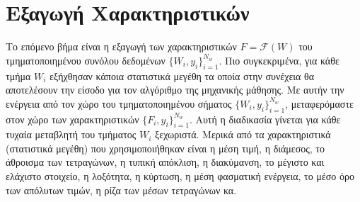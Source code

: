 \documentclass[12pt, a4paper]{article}
\begin{document}
\section{Εξαγωγή Χαρακτηριστικών}
Το επόμενο βήμα είναι η εξαγωγή των χαρακτηριστικών $F = \mathcal{F}(W)$ του τμηματοποιημένου συνόλου δεδομένων $\{W_{i}, y_{i}\}_{i=1}^{N_{w}}$. Πιο συγκεκριμένα, για κάθε τμήμα $W_{i}$ εξήχθησαν κάποια στατιστικά μεγέθη τα οποία στην συνέχεια θα αποτελέσουν την είσοδο για τον αλγόριθμο της μηχανικής μάθησης. Με αυτήν την ενέργεια από τον χώρο του τμηματοποιημένου σήματος $\{W_{i}, y_{i}\}_{i=1}^{N_{w}}$, μεταφερόμαστε στον χώρο των χαρακτηριστικών $\{F_{i}, y_{i}\}_{i=1}^{N_{w}}$. Αυτή η διαδικασία γίνεται για κάθε τυχαία μεταβλητή του τμήματος $W_{i}$ ξεχωριστά. Μερικά από τα χαρακτηριστικά (στατιστικά μεγέθη) που χρησιμοποιήθηκαν είναι η μέση τιμή, η διάμεσος, το άθροισμα των τετραγώνων, η τυπική απόκλιση, η διακύμανση, το μέγιστο και ελάχιστο στοιχείο, η λοξότητα, η κύρτωση, η μέση φασματική ενέργεια, το μέσο όρο των απόλυτων τιμών, η ρίζα των μέσων τετραγώνων κα.


		
%		
		
		
		
		
		
		
\end{document}
